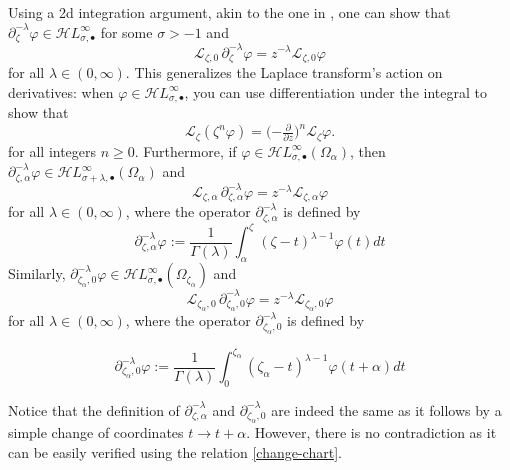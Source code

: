 \documentclass{article}
\newcommand{\singexp}[2]{\mathcal{H}L^\infty_{#1, #2}}
\newcommand{\singexpalg}[1]{\singexp{#1}{\bullet}}
\theoremstyle{definition}
\newcommand{\fracderiv}[3]{\partial^{#1}_{#2, #3}}
\newcommand{\laplace}{\mathcal{L}}
\theoremstyle{plain}
\begin{document}
Using a 2d integration argument, akin to the one in \cite[Theorem~2.39]{laplace-tfm}, one can show that $\partial^{-\lambda}_{\zeta} \varphi \in \singexpalg{\sigma}$ for some $\sigma>-1$ and
\[ \laplace_{\zeta,0}\,\partial^{-\lambda}_{\zeta} \varphi = z^{-\lambda} \laplace_{\zeta, 0} \varphi \]
for all $\lambda \in (0, \infty)$. This generalizes the Laplace transform's action on derivatives: when $\varphi \in \singexpalg{\sigma}$, you can use differentiation under the integral to show that~\cite[Theorem~1.34]{laplace-tfm}
\begin{equation}%
\laplace_\zeta (\zeta^n \varphi) = \big({-\tfrac{\partial}{\partial z}}\big)^n \laplace_\zeta \varphi.
\end{equation}
for all integers $n \ge 0$.
Furthermore, if $\varphi\in\singexpalg{\sigma}(\Omega_\alpha)$, then $\partial_{\zeta,\alpha}^{-\lambda}\varphi\in\singexpalg{\sigma+\lambda}(\Omega_\alpha)$ and 
\[ \laplace_{\zeta, \alpha}\,\fracderiv{-\lambda}{\zeta}{\alpha} \varphi = z^{-\lambda} \laplace_{\zeta, \alpha} \varphi \]
for all $\lambda \in (0, \infty)$, where the operator $\partial_{\zeta,\alpha}^{-\lambda}$ is defined by 
%
\begin{equation}
    \partial_{\zeta,\alpha}^{-\lambda}\varphi:=\frac{1}{\Gamma(\lambda)}\int_{\alpha}^{\zeta}(\zeta-t)^{\lambda-1} \varphi(t) dt
\end{equation}
%
Similarly, $\partial_{\zeta_\alpha,0}^{-\lambda}\varphi\in\singexpalg{\sigma}(\Omega_{\zeta_\alpha})$ and 
\[ \laplace_{\zeta_\alpha,0}\,\fracderiv{-\lambda}{\zeta_\alpha}{0} \varphi = z^{-\lambda} \laplace_{\zeta_\alpha,0} \varphi \]
for all $\lambda \in (0, \infty)$, where the operator $\partial_{\zeta_\alpha,0}^{-\lambda}$ is defined by 

\begin{equation}
    \partial_{\zeta_\alpha,0}^{-\lambda}\varphi:=\frac{1}{\Gamma(\lambda)}\int_{0}^{\zeta_\alpha}(\zeta_\alpha-t)^{\lambda-1} \varphi(t+\alpha) dt
\end{equation}

Notice that the definition of $\fracderiv{-\lambda}{\zeta}{\alpha}$ and $\fracderiv{-\lambda}{\zeta_\alpha}{0}$ are indeed the same as it follows by a simple change of coordinates $t\to t+\alpha$. However, there is no contradiction as it can be easily verified using the relation \eqref{change-chart}. 

\end{document}
